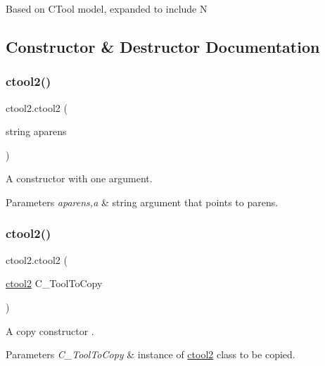 Based on C\+Tool model, expanded to include N 

\subsection{Constructor \& Destructor Documentation}
\mbox{\label{classctool2_ab334aea1ee225ec86031984a2cf87577}} 
\subsubsection{\texorpdfstring{ctool2()}{ctool2()}\hspace{0.1cm}{\footnotesize\ttfamily [1/2]}}
{\footnotesize\ttfamily ctool2.\+ctool2 (\begin{DoxyParamCaption}\item[{string}]{aparens }\end{DoxyParamCaption})\hspace{0.3cm}{\ttfamily [inline]}}



A constructor with one argument. 


\begin{DoxyParams}{Parameters}
{\em aparens,a} & string argument that points to parens. \\
\hline
\end{DoxyParams}
\mbox{\label{classctool2_aa42611f6b7b54168648f5b7896157e51}} 
\subsubsection{\texorpdfstring{ctool2()}{ctool2()}\hspace{0.1cm}{\footnotesize\ttfamily [2/2]}}
{\footnotesize\ttfamily ctool2.\+ctool2 (\begin{DoxyParamCaption}\item[{\mbox{\hyperlink{classctool2}{ctool2}}}]{C\+\_\+\+Tool\+To\+Copy }\end{DoxyParamCaption})\hspace{0.3cm}{\ttfamily [inline]}}



A copy constructor . 


\begin{DoxyParams}{Parameters}
{\em C\+\_\+\+Tool\+To\+Copy} & instance of \mbox{\hyperlink{classctool2}{ctool2}} class to be copied. \\
\hline
\end{DoxyParams}


